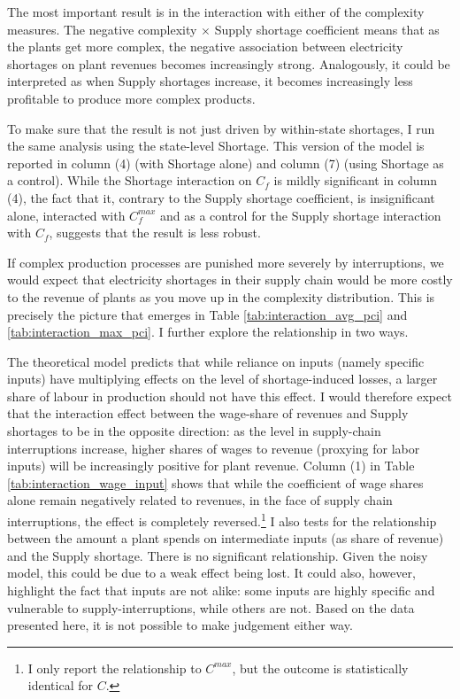 \documentclass[11pt]{article}
\begin{document}
The most important result is in the interaction with either of the complexity measures. The negative complexity $\times$ Supply shortage coefficient means that as the plants get more complex, the negative association between electricity shortages on plant revenues becomes increasingly strong. Analogously, it could be interpreted as when Supply shortages increase, it becomes increasingly less profitable to produce more complex products.

To make sure that the result is not just driven by within-state shortages, I run the same analysis using the state-level Shortage. This version of the model is reported in column (4) (with Shortage alone) and column (7) (using Shortage as a control). While the Shortage interaction on $C_f$ is mildly significant in column (4), the fact that it, contrary to the Supply shortage coefficient, is insignificant alone, interacted with $C^{max}_f$ and as a control for the Supply shortage interaction with $C_f$, suggests that the result is less robust. 

If complex production processes are punished more severely by interruptions, we would expect that electricity shortages in their supply chain would be more costly to the revenue of plants as you move up in the complexity distribution. This is precisely the picture that emerges in Table \ref{tab:interaction_avg_pci} and \ref{tab:interaction_max_pci}. I further explore the relationship in two ways.

The theoretical model predicts that while reliance on inputs (namely specific inputs) have multiplying effects on the level of shortage-induced losses, a larger share of labour in production should not have this effect. I would therefore expect that the interaction effect between the wage-share of revenues and Supply shortages to be in the opposite direction: as the level in supply-chain interruptions increase, higher shares of wages to revenue (proxying for labor inputs) will be increasingly positive for plant revenue. Column (1) in Table \ref{tab:interaction_wage_input} shows that while the coefficient of wage shares alone remain negatively related to revenues, in the face of supply chain interruptions, the effect is completely reversed.\footnote{I only report the relationship to $C^{max}$, but the outcome is statistically identical for $C$.} I also tests for the relationship between the amount a plant spends on intermediate inputs (as  share of revenue) and the Supply shortage. There is no significant relationship. Given the noisy model, this could be due to a weak effect being lost. It could also, however, highlight the fact that inputs are not alike: some inputs are highly specific and vulnerable to supply-interruptions, while others are not. Based on the data presented here, it is not possible to make judgement either way.
\end{document}
